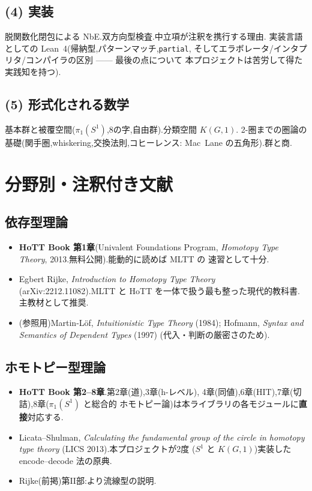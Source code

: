 \documentclass[11pt]{ltjsarticle}
\begin{document}
\subsection*{(4) 実装}
脱関数化閉包による NbE.双方向型検査.中立項が注釈を携行する理由.
実装言語としての Lean~4(帰納型,パターンマッチ,\texttt{partial},
そしてエラボレータ/インタプリタ/コンパイラの区別 —— 最後の点について
本プロジェクトは苦労して得た実践知を持つ).

\subsection*{(5) 形式化される数学}
基本群と被覆空間($\pi_1(S^1)$,8の字,自由群).分類空間 $K(G,1)$.
2-圏までの圏論の基礎(関手圏,whiskering,交換法則,コヒーレンス:
Mac~Lane の五角形).群と商.

\section{分野別・注釈付き文献}

\subsection{依存型理論}
\begin{itemize}[leftmargin=1.5em]
\item \textbf{HoTT Book 第1章}(Univalent Foundations Program,
\emph{Homotopy Type Theory}, 2013.無料公開).能動的に読めば MLTT の
速習として十分.
\item Egbert Rijke, \emph{Introduction to Homotopy Type Theory}
(arXiv:2212.11082).MLTT と HoTT を一体で扱う最も整った現代的教科書.
主教材として推奨.
\item (参照用)Martin-L\"of, \emph{Intuitionistic Type Theory} (1984);
Hofmann, \emph{Syntax and Semantics of Dependent Types} (1997)
(代入・判断の厳密さのため).
\end{itemize}

\subsection{ホモトピー型理論}
\begin{itemize}[leftmargin=1.5em]
\item \textbf{HoTT Book 第2--8章}.第2章(道),3章(h-レベル),
4章(同値),6章(HIT),7章(切詰),8章($\pi_1(S^1)$ と総合的
ホモトピー論)は本ライブラリの各モジュールに\textbf{直接}対応する.
\item Licata--Shulman, \emph{Calculating the fundamental group of the
circle in homotopy type theory} (LICS 2013).本プロジェクトが2度
($S^1$ と $K(G,1)$)実装した encode--decode 法の原典.
\item Rijke(前掲)第II部:より流線型の説明.
\end{itemize}
\end{document}
